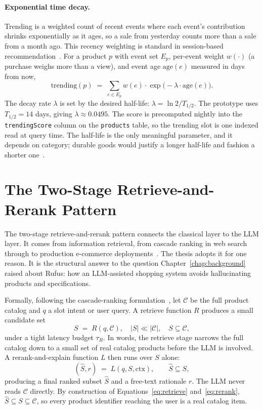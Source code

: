 \paragraph{Exponential time decay.} Trending is a weighted count
of recent events where each event's contribution shrinks
exponentially as it ages, so a sale from yesterday counts more
than a sale from a month ago. This recency weighting is standard
in session-based recommendation~\cite{SessionRecSys2021}. For a
product $p$ with event set
$E_p$, per-event weight $w(\cdot)$ (a purchase weighs more than a
view), and event age $\mathrm{age}(e)$ measured in days from now,
\begin{equation}
  \mathrm{trending}(p) \;=\; \sum_{e \in E_p} w(e) \cdot
  \exp\!\big(-\lambda \cdot \mathrm{age}(e)\big).
  \label{eq:trending}
\end{equation}
The decay rate $\lambda$ is set by the desired half-life:
$\lambda = \ln 2 / T_{1/2}$. The prototype uses $T_{1/2} = 14$
days, giving $\lambda \approx 0.0495$. The score is precomputed
nightly into the \texttt{trendingScore} column on the
\texttt{products} table, so the trending slot is one indexed read
at query time. The half-life is the only meaningful parameter, and it
depends on category; durable goods would justify a longer
half-life and fashion a shorter one~\cite{SessionRecSys2021}.

\section{The Two-Stage Retrieve-and-Rerank Pattern}
\label{sec:found-two-stage}

The two-stage retrieve-and-rerank pattern connects the classical
layer to the LLM layer. It comes from information retrieval,
from cascade ranking in web search~\cite{HSTU2024} through to
production e-commerce deployments~\cite{ShopifyHSTU}. The thesis
adopts it for one reason. It is the structural answer to
the question Chapter~\ref{chap:background} raised about Rufus:
how an LLM-assisted shopping system avoids hallucinating
products and specifications.

Formally, following the cascade-ranking
formulation~\cite{HSTU2024}, let $\mathcal{C}$ be the full
product catalog and $q$ a
slot intent or user query. A retrieve function $R$ produces a
small candidate set
\begin{equation}
  S \;=\; R(q, \mathcal{C}), \quad |S| \ll |\mathcal{C}|,
  \quad S \subseteq \mathcal{C},
  \label{eq:retrieve}
\end{equation}
under a tight latency budget $\tau_R$. In words, the retrieve
stage narrows the full catalog down to a small set of real
catalog products before the LLM is involved. A rerank-and-explain
function $L$ then runs over $S$ alone:
\begin{equation}
  (\hat{S}, r) \;=\; L(q, S, \textrm{ctx}), \qquad \hat{S} \subseteq S,
  \label{eq:rerank}
\end{equation}
producing a final ranked subset $\hat{S}$ and a free-text
rationale $r$. The LLM never reads $\mathcal{C}$ directly. By
construction of Equations~\ref{eq:retrieve} and~\ref{eq:rerank},
$\hat{S} \subseteq S \subseteq \mathcal{C}$, so every
product identifier reaching the user is a real catalog item.

